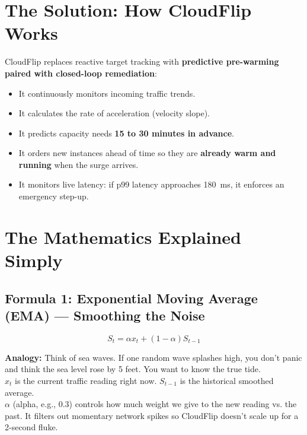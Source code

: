 \documentclass[11pt,letterpaper]{article}
\begin{document}
\section{The Solution: How CloudFlip Works}
CloudFlip replaces reactive target tracking with \textbf{predictive pre-warming paired with closed-loop remediation}:
\begin{itemize}[itemsep=1pt]
  \item It continuously monitors incoming traffic trends.
  \item It calculates the rate of acceleration (velocity slope).
  \item It predicts capacity needs \textbf{15 to 30 minutes in advance}.
  \item It orders new instances ahead of time so they are \textbf{already warm and running} when the surge arrives.
  \item It monitors live latency: if p99 latency approaches 180~ms, it enforces an emergency step-up.
\end{itemize}

\section{The Mathematics Explained Simply}

\subsection{Formula 1: Exponential Moving Average (EMA) --- Smoothing the Noise}
\begin{equation}
S_t = \alpha x_t + (1 - \alpha) S_{t-1}
\end{equation}
\begin{tcolorbox}[title=Intuition \& Why We Use It]
\textbf{Analogy:} Think of sea waves. If one random wave splashes high, you don't panic and think the sea level rose by 5 feet. You want to know the true tide. \\
$x_t$ is the current traffic reading right now. $S_{t-1}$ is the historical smoothed average. \\
$\alpha$ (alpha, e.g., 0.3) controls how much weight we give to the new reading vs. the past. It filters out momentary network spikes so CloudFlip doesn't scale up for a 2-second fluke.
\end{tcolorbox}
\end{document}
